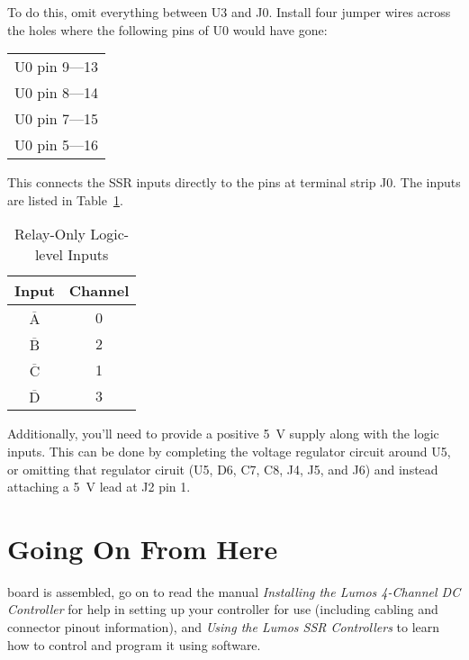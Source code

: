 \documentclass[letterpaper,twoside,onecolumn,openright,final]{memoir}
\begin{document}
To do this, omit everything between U3 and J0.  Install four jumper wires across the 
holes where the following pins of U0 would have gone:
\begin{center}
 \begin{tabular}{c}
  U0 pin 9---13 \\
  U0 pin 8---14 \\
  U0 pin 7---15 \\
  U0 pin 5---16 \\
 \end{tabular}
\end{center}
This connects the SSR inputs directly to the pins at terminal strip J0.  The inputs
are listed in Table~\ref{tbl:relayonly}.
\begin{table}
 \begin{center}
  \begin{tabular}{cc}\toprule
   \bfseries Input & \bfseries Channel \\\midrule
   $\overline{\textrm{A}}$ & 0 \\
   $\overline{\textrm{B}}$ & 2 \\
   $\overline{\textrm{C}}$ & 1 \\
   $\overline{\textrm{D}}$ & 3 \\
  \bottomrule
  \end{tabular}
  \caption{Relay-Only Logic-level Inputs\label{tbl:relayonly}}
 \end{center}
\end{table}

Additionally, you'll need to provide a positive \SI{5}{\volt} supply along with the
logic inputs.  This can be done by completing the voltage regulator circuit around U5,
or omitting that regulator ciruit (U5, D6, C7, C8, J4, J5, and J6) and instead attaching
a \SI{+5}{\volt} lead at J2 pin 1.
\chapter{Going On From Here}\label{ch:goingon}
 board is assembled, go on to read the manual
\emph{Installing the Lumos 4-Channel DC Controller} for help in setting up your controller
for use (including cabling and connector pinout information), and
\emph{Using the Lumos SSR Controllers} to learn how to control and program it using software.
\end{document}
